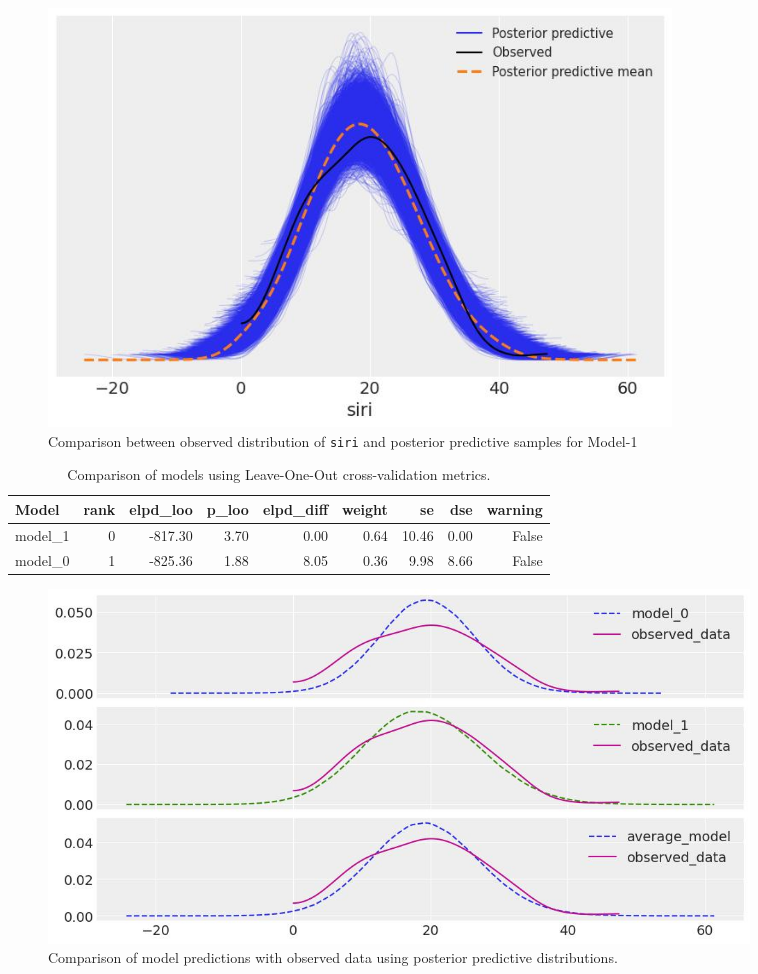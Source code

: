 \documentclass[12 pt]{scrartcl}
\begin{document}
	\begin{figure}[h!]
		\centering
		\includegraphics[width=0.8\textwidth]{Figures/3.jpeg}
		\caption{Comparison between observed distribution of \texttt{siri} and posterior predictive samples for Model-1}
		
		\label{fig:model1_results}
	\end{figure}
	
	\begin{table}[h!]
		\centering 
		\begin{tabular}{|l|r|r|r|r|r|r|r|r|}
			\hline
			\textbf{Model} & \textbf{rank} & \textbf{elpd\_loo} & \textbf{p\_loo} & \textbf{elpd\_diff} & \textbf{weight} & \textbf{se} & \textbf{dse} & \textbf{warning} \\
			\hline
			model\_1 & 0 & -817.30 & 3.70 & 0.00 & 0.64 & 10.46 & 0.00 & False \\ \hline
			model\_0 & 1 & -825.36 & 1.88 & 8.05 & 0.36 & 9.98  & 8.66 & False \\
			\hline 
		\end{tabular}
		\caption{Comparison of models using Leave-One-Out cross-validation metrics.}
		
		\label{tab:model_comparison}
	\end{table} 
		
	\begin{figure}[h!]
		\centering
		\includegraphics[width=0.9\textwidth]{Figures/4.jpeg}
		\caption{Comparison of model predictions with observed data using posterior predictive distributions.}
		
		\label{fig:model_comparison}
	\end{figure}
	
\end{document}
